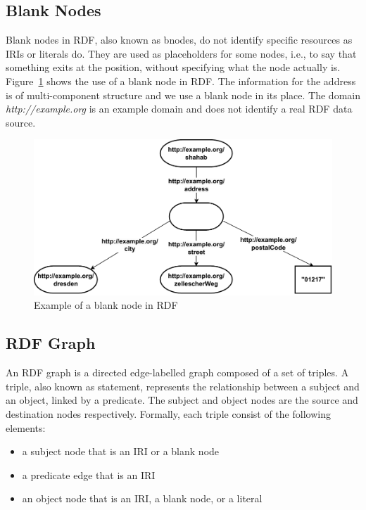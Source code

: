 \subsection*{Blank Nodes}
Blank nodes in RDF, also known as bnodes, do not identify specific resources as IRIs or literals do. They are used as placeholders for some nodes, i.e., to say that something exits at the position, without specifying what the node actually is. Figure~\ref{fig:3} shows the use of a blank node in RDF. The information for the address is of multi-component structure and we use a blank node in its place. The domain \textit{http://example.org} is an example domain and does not identify a real RDF data source.

\begin{figure}[h]
  \centering
  \includegraphics[width=0.80\linewidth]{images/blank_node.drawio.pdf}
  \caption{Example of a blank node in RDF}
  \label{fig:3}
\end{figure}

\subsection{RDF Graph}
\label{subsec:rdf-graph}
\begin{definition}	
An RDF graph is a directed edge-labelled graph composed of a set of triples. A triple, also known as statement, represents the relationship between a subject and an object, linked by a predicate. The subject and object nodes are the source and destination nodes respectively. Formally, each triple consist of the following elements:   

\begin{itemize}
	\item a subject node that is an IRI or a blank node
	\item a predicate edge that is an IRI
	\item an object node that is an IRI, a blank node, or a literal
\end{itemize}	

\end{definition}


